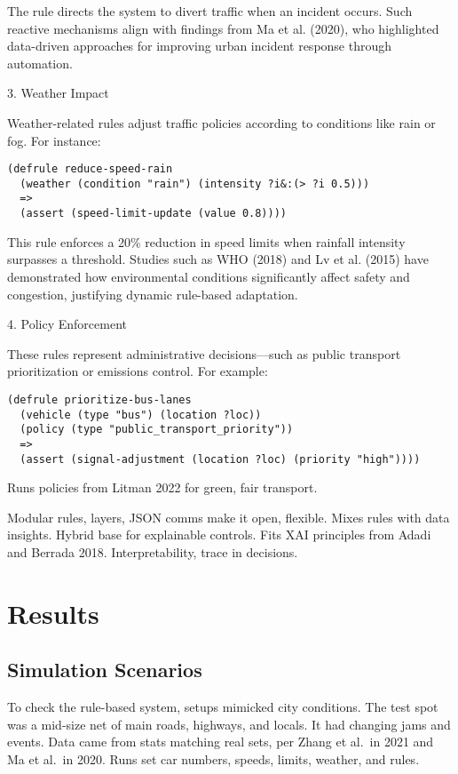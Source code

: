 \documentclass{article}
\begin{document}
The rule directs the system to divert traffic when an incident occurs. Such reactive mechanisms align with findings from Ma et al. (2020), who highlighted data-driven approaches for improving urban incident response through automation.

3. Weather Impact

Weather-related rules adjust traffic policies according to conditions like rain or fog. For instance:

\begin{verbatim}
(defrule reduce-speed-rain
  (weather (condition "rain") (intensity ?i&:(> ?i 0.5)))
  =>
  (assert (speed-limit-update (value 0.8))))
\end{verbatim}

This rule enforces a 20\% reduction in speed limits when rainfall intensity surpasses a threshold. Studies such as WHO (2018) and Lv et al. (2015) have demonstrated how environmental conditions significantly affect safety and congestion, justifying dynamic rule-based adaptation.

4. Policy Enforcement

These rules represent administrative decisions—such as public transport prioritization or emissions control. For example:

\begin{verbatim}
(defrule prioritize-bus-lanes
  (vehicle (type "bus") (location ?loc))
  (policy (type "public_transport_priority"))
  =>
  (assert (signal-adjustment (location ?loc) (priority "high"))))
\end{verbatim}

Runs policies from Litman 2022 for green, fair transport.

Modular rules, layers, JSON comms make it open, flexible. Mixes rules with data insights. Hybrid base for explainable controls. Fits XAI principles from Adadi and Berrada 2018. Interpretability, trace in decisions.

\section{Results}

\subsection{Simulation Scenarios}

To check the rule-based system, setups mimicked city conditions. The test spot was a mid-size net of main roads, highways, and locals. It had changing jams and events. Data came from stats matching real sets, per Zhang et al.\ in 2021 and Ma et al.\ in 2020. Runs set car numbers, speeds, limits, weather, and rules.
\end{document}

